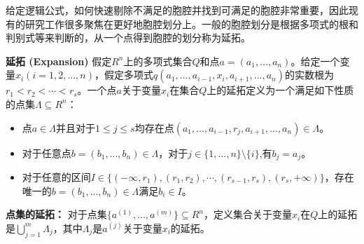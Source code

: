 给定逻辑公式，如何快速剔除不满足的胞腔并找到可满足的胞腔非常重要，因此现有的研究工作很多聚焦在更好地胞腔划分上。一般的胞腔划分是根据多项式的根和判别式等来判断的，从一个点得到胞腔的划分称为延拓。

\begin{definition}{\textbf{延拓 (Expansion)}}
假定$R^n$上的多项式集合$Q$和点$a = (a_1, ..., a_n)$。给定一个变量$x_i (i = 1, 2,..., n)$，假定多项式$
q(a_1, ..., a_{i-1}, x_i, a_{i+1}, ..., a_n)$的实数根为$r_1 < r_2 < \cdots < r_s$。一个点$a$关于变量$x_i$在集合$Q$上的延拓定义为一个满足如下性质的点集$\Lambda \subseteq R^n$：
\begin{itemize}
    \item 点$a \in \Lambda$并且对于$1 \leq j \leq s$均存在点$(a_1, ..., a_{i-1}, r_j, a_{i+1}, ..., a_n) \in \Lambda$。
    \item 对于任意点$b = (b_1, ..., b_n) \in \Lambda$，对于$j \in \{1, ..., n\} \setminus \{i\}$,有$b_j = a_j$。
    \item 对于任意的区间$I \in \{(-\infty, r_1), (r_1, r_2), \cdots, (r_{s-1}, r_s), (r_s, +\infty)\}$，存在唯一的$b = (b_1, ..., b_n) \in \Lambda$满足$b_i \in I$。
\end{itemize}
\textbf{点集的延拓：} 对于点集$\{a^{(1)}, ..., a^{(m)}\} \subseteq R^n$，定义集合关于变量$x_i$在$Q$上的延拓是$\bigcup_{j=1}^m \Lambda_j$，其中$\Lambda_j$是$a^{(j)}$关于变量$x_i$的延拓。
\end{definition}

